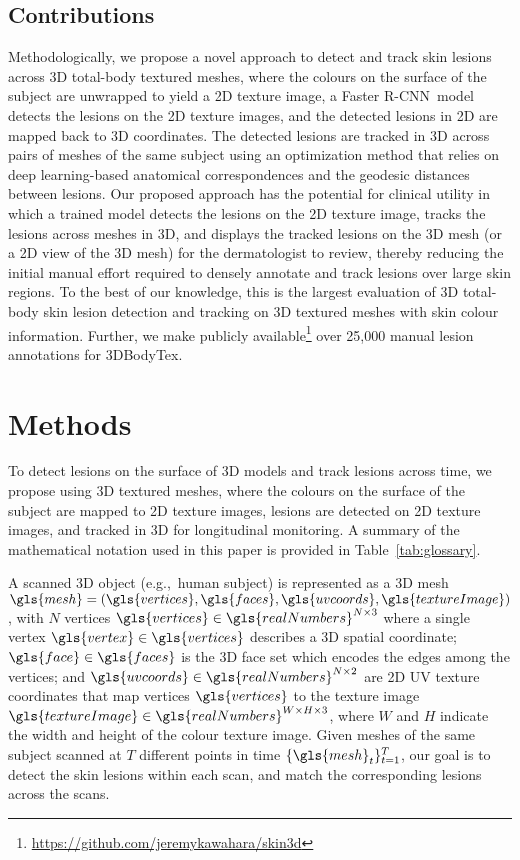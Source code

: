 \documentclass[journal]{IEEEtran}
\def\eg{e.g.,~}
\def\fasterrcnn{Faster R-CNN}
\begin{document}
\subsection{Contributions}
Methodologically, we propose a novel approach to detect and track skin lesions across 3D total-body textured meshes, where the colours on the surface of the subject are unwrapped to yield a 2D texture image, a \fasterrcnn~model detects the lesions on the 2D texture images, and the detected lesions in 2D are mapped back to 3D coordinates. The detected lesions are tracked in 3D across pairs of meshes of the same subject using an optimization method that relies on deep learning-based anatomical correspondences and the geodesic distances between lesions. Our proposed approach has the potential for clinical utility in which a trained model detects the lesions on the 2D texture image, tracks the lesions across meshes in 3D, and displays the tracked lesions on the 3D mesh (or a 2D view of the 3D mesh) for the dermatologist to review, thereby reducing the initial manual effort required to densely annotate and track lesions over large skin regions. To the best of our knowledge, this is the largest evaluation of 3D total-body skin lesion detection and tracking on 3D textured meshes with skin colour information. Further, we make publicly available\protect\footnote{ \url{https://github.com/jeremykawahara/skin3d}} over 25,000 manual lesion annotations for 3DBodyTex.

\section{Methods}
\label{skin3d:sec:methods}
To detect lesions on the surface of 3D models and track lesions across time, we propose using 3D textured meshes, where the colours on the surface of the subject  are mapped to 2D texture images, lesions are detected on 2D texture images, and tracked in 3D for longitudinal monitoring. A summary of the mathematical notation used in this paper is provided in Table~\ref{tab:glossary}.

A scanned 3D object (\eg human subject) is represented as a 3D mesh $\gls{mesh}=(\gls{vertices}, \gls{faces}, \gls{uvcoords}, \gls{textureImage})$, with $N$ vertices $\gls{vertices} \in \gls{realNumbers}^{N \times 3}$ where a single vertex $\gls{vertex} \in \gls{vertices}$ describes a 3D spatial coordinate; $\gls{face} \in \gls{faces}$ is the 3D face set which encodes the edges among the vertices; and $\gls{uvcoords} \in \gls{realNumbers}^{N \times 2}$ are 2D UV texture coordinates that map vertices $\gls{vertices}$ to the texture image $\gls{textureImage} \in \gls{realNumbers}^{W \times H \times 3}$, where $W$ and $H$ indicate the width and height of the colour texture image. Given meshes of the same subject scanned at $T$ different points in time $\{\gls{mesh}_t\}_{t=1}^T$, our goal is to detect the skin lesions within each scan, and match the corresponding lesions across the scans.
\end{document}

